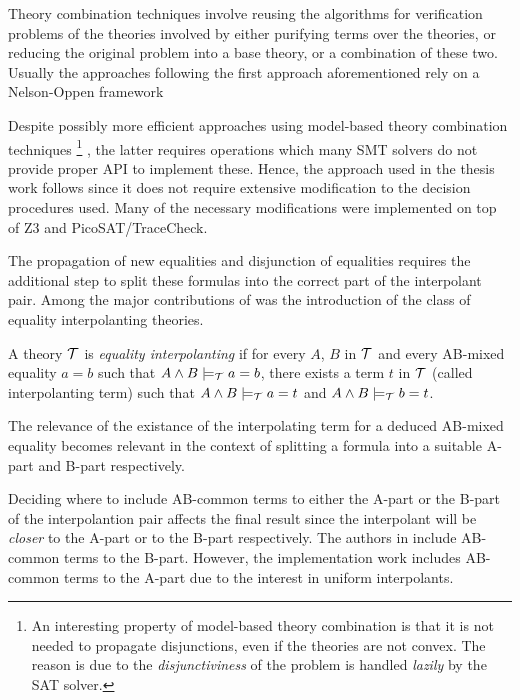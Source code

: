 Theory combination techniques involve 
reusing the algorithms for verification 
problems of the theories involved 
by either purifying terms over the 
theories, or reducing the original problem 
into a base theory, or a combination of these two. 
Usually the approaches following the first approach 
aforementioned rely on a Nelson-Oppen
framework \cite{10.1007/11532231_26, 
10.1007/978-3-642-22119-4_1, 10.1145/2490253}

Despite possibly more efficient approaches using
model-based theory combination techniques 
\footnote{
  An interesting property of model-based theory combination 
  is that it is not needed to propagate disjunctions, even if
  the theories are not convex. The reason is due to 
  the \emph{disjunctiviness} of the problem is handled 
  \emph{lazily} by the
  SAT solver.
} \cite{10.1007/978-3-642-22119-4_1}, the latter requires 
operations which many SMT solvers do not provide 
proper API to implement these.
Hence, the approach used in the thesis work follows 
\cite{10.1007/11532231_26} since it does not require extensive
modification to the decision procedures
used. Many of the necessary modifications 
were implemented on top of Z3 and PicoSAT/TraceCheck.

The propagation of new equalities and disjunction of equalities
requires the additional step to split these formulas into
the correct part of the interpolant pair. Among the major
contributions of \cite{10.1007/11532231_26} was the introduction
of the class of equality interpolanting theories.

\begin{definition}
  A theory $\cal{T}$ is \emph{equality interpolanting}
  if for every $A$, $B$ in $\cal{T}$ and every AB-mixed
  equality $a = b$ such that $A \land B \models_{\cal{T}} a = b$,
  there exists a term $t$
  in $\cal{T}$ (called interpolanting term)
  such that $A \land B \models_{\cal{T}} a = t$ and 
  $A \land B \models_{\cal{T}} b = t$.
\end{definition}

The relevance of the existance of the interpolating term for 
a deduced AB-mixed equality becomes relevant in the context 
of splitting a formula into a suitable A-part and B-part 
respectively.

Deciding where to include AB-common terms to either the 
A-part or the B-part of the interpolantion pair affects 
the final result since the interpolant will be \emph{closer} 
to the A-part or to the B-part respectively. The authors in 
\cite{10.1007/11532231_26} include AB-common terms to the B-part. 
However, the implementation work includes AB-common terms to the
A-part due to the interest in uniform interpolants.

